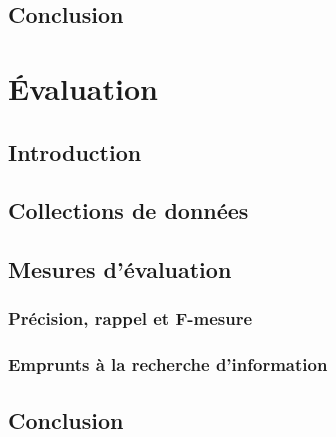     \section{Conclusion}
    \label{sec:main-state_of_the_art-automatic_keyphrase_extraction-conclusion}


  \chapter{Évaluation}
  \label{chap:main-state_of_the_art-evaluation}
    \section{Introduction}
    \label{sec:main-state_of_the_art-evaluation-introduction}

    \section{Collections de données}
    \label{sec:main-state_of_the_art-evaluation-evaluation_corpora}

    \section{Mesures d'évaluation}
    \label{sec:main-state_of_the_art-evaluation-evaluation_measures}
      \subsection{Précision, rappel et F-mesure}
      \label{subsec:main-state_of_the_art-evaluation-evaluation-evaluation_measures-precision_recall_and_f_measure}

      \subsection{Emprunts à la recherche d'information}
      \label{subsec:main-state_of_the_art-evaluation-evaluation-evaluation_measures-information_retrieval_measures}

    \section{Conclusion}
    \label{sec:main-state_of_the_art-evaluation-conclusion}

